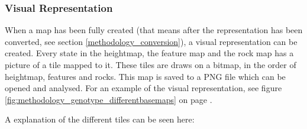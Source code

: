 \subsubsection{Visual Representation}
When a map has been fully created (that means after the representation has been converted, see section \ref{methodology_conversion}), a visual representation can be created. Every state in the heightmap, the feature map and the rock map has a picture of a tile mapped to it. These tiles are draws on a bitmap, in the order of heightmap, features and rocks. This map is saved to a PNG file which can be opened and analysed. For an example of the visual representation, see figure \ref{fig:methodology_genotype_differentbasemaps} on page \pageref{fig:methodology_genotype_differentbasemaps}.

A explanation of the different tiles can be seen here:


